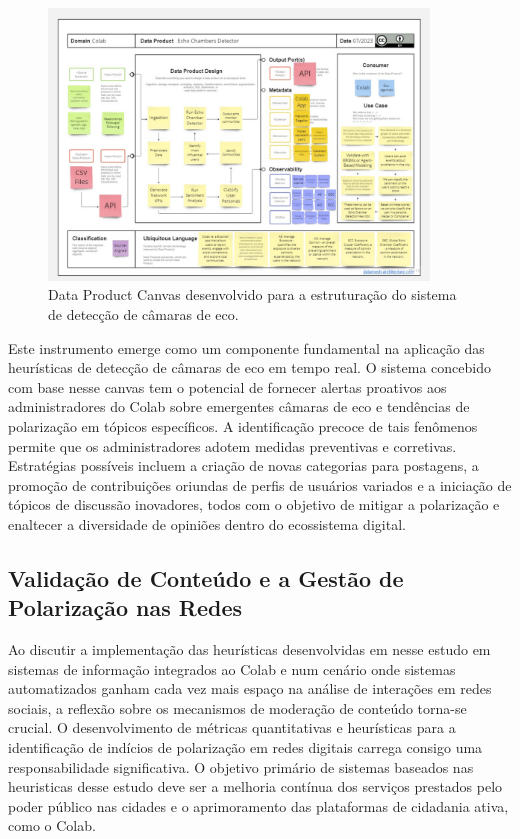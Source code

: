 \begin{figure}[H]
	\centering
	\includegraphics[width=0.9\textwidth]{tex/includes/data_canvas.pdf}
	\caption{Data Product Canvas desenvolvido para a estruturação do sistema de detecção de câmaras de eco.}
	\label{fig:data_canvas}
\end{figure}

Este instrumento emerge como um componente fundamental na aplicação das heurísticas de detecção de câmaras de eco em tempo real. O sistema concebido com base nesse canvas tem o potencial de fornecer alertas proativos aos administradores do Colab sobre emergentes câmaras de eco e tendências de polarização em tópicos específicos. A identificação precoce de tais fenômenos permite que os administradores adotem medidas preventivas e corretivas. Estratégias possíveis incluem a criação de novas categorias para postagens, a promoção de contribuições oriundas de perfis de usuários variados e a iniciação de tópicos de discussão inovadores, todos com o objetivo de mitigar a polarização e enaltecer a diversidade de opiniões dentro do ecossistema digital.

\subsection*{Validação de Conteúdo e a Gestão de Polarização nas Redes}

Ao discutir a implementação das heurísticas desenvolvidas em nesse estudo em sistemas de informação integrados ao Colab e num cenário onde sistemas automatizados ganham cada vez mais espaço na análise de interações em redes sociais, a reflexão sobre os mecanismos de moderação de conteúdo torna-se crucial. O desenvolvimento de métricas quantitativas e heurísticas para a identificação de indícios de polarização em redes digitais carrega consigo uma responsabilidade significativa. O objetivo primário de sistemas baseados nas heuristicas desse estudo deve ser a melhoria contínua dos serviços prestados pelo poder público nas cidades e o aprimoramento das plataformas de cidadania ativa, como o Colab.

